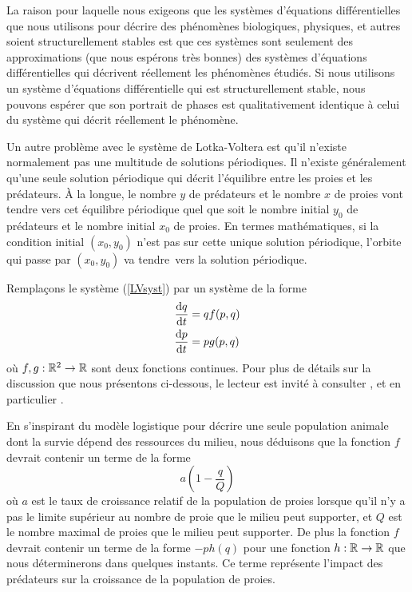 {La raison pour laquelle nous exigeons que les systèmes d'équations
différentielles que nous utilisons pour décrire des phénomènes
biologiques, physiques, et autres soient structurellement stables est
que ces systèmes sont seulement des approximations (que nous espérons
très bonnes) des systèmes d'équations différentielles qui décrivent
réellement les phénomènes étudiés.  Si nous utilisons un système
d'équations différentielle qui est structurellement stable, nous
pouvons espérer que son portrait de phases est qualitativement
identique à celui du système qui décrit réellement le phénomène.

Un autre problème avec le système de Lotka-Voltera est qu'il n'existe
normalement pas une multitude de solutions périodiques.  Il n'existe
généralement qu'une seule solution périodique qui décrit l'équilibre
entre les proies et les prédateurs.  À la longue, le nombre $y$ de
prédateurs et le nombre $x$ de proies vont tendre vers cet équilibre
périodique quel que soit le nombre initial $y_0$ de prédateurs et le
nombre initial $x_0$ de proies.  En termes mathématiques, si la
condition initial $(x_0,y_0)$ n'est pas sur cette unique solution
périodique, l'orbite qui passe par $(x_0,y_0)$ va \flqq tendre\frqq\
vers la solution périodique.

Remplaçons le système (\ref{LVsyst}) par un système de la forme
\begin{equation} \label{better_prepro}
\begin{split}
\frac{\mathrm{d}q}{\mathrm{d}t} &= q f(p,q) \\
\frac{\mathrm{d}p}{\mathrm{d}t} &= p g(p,q)
\end{split}
\end{equation}
où $f,g:\mathbb{R}^2 \rightarrow \mathbb{R}$ sont deux fonctions continues.   Pour
plus de détails sur la discussion que nous présentons ci-dessous, le
lecteur est invité à consulter \cite{A}, \cite{NH} et en
particulier \cite{M}.

En s'inspirant du modèle logistique pour décrire une seule population animale
dont la survie dépend des ressources du milieu, nous déduisons que la
fonction $f$ devrait contenir un terme de la forme
\[
a \left( 1 - \frac{q}{Q}\right)
\]
où $a$ est le taux de croissance relatif de la population de proies lorsque
qu'il n'y a pas le limite supérieur au nombre de proie que le milieu peut
supporter, et $Q$ est le nombre maximal de proies que le milieu peut supporter.
De plus la fonction $f$ devrait contenir un terme de la forme $ -p h(q)$
pour une fonction $h:\mathbb{R}\rightarrow \mathbb{R}$ que nous déterminerons dans quelques
instants.  Ce terme représente l'impact des prédateurs sur la
croissance de la population de proies.

}
